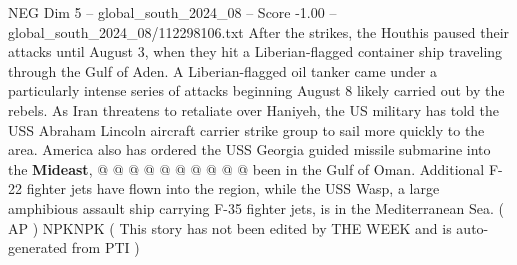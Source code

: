 \begin{textsample}{NEG Dim 5 – global\_south\_2024\_08 – Score -1.00 – global\_south\_2024\_08/112298106.txt}
After the strikes, the Houthis paused their attacks until August 3, when they hit a Liberian-flagged container ship traveling through the Gulf of Aden.
A Liberian-flagged oil tanker came under a particularly intense series of attacks beginning August 8 likely carried out by the rebels.
As Iran threatens to retaliate over Haniyeh, the US military has told the USS Abraham Lincoln aircraft carrier strike group to sail more quickly to the area.
America also has ordered the USS Georgia guided missile submarine into the \textbf{Mideast}, @ @ @ @ @ @ @ @ @ @ been in the Gulf of Oman.
Additional F-22 fighter jets have flown into the region, while the USS Wasp, a large amphibious assault ship carrying F-35 fighter jets, is in the Mediterranean Sea. ( AP ) NPKNPK ( This story has not been edited by THE WEEK and is auto-generated from PTI )

\end{textsample}
